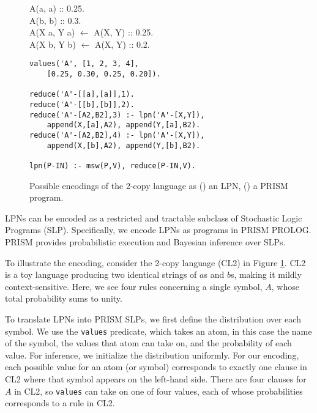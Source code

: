 \documentclass[11pt, twocolumn]{article}
\begin{document}
\begin{figure}[t]
	\centering
	\begin{minipage}[b]{\linewidth}
A(a, a) :: 0.25. \\
A(b, b) :: 0.3. \\
A(X a, Y a) $\leftarrow$ A(X, Y) :: 0.25. \\
A(X b, Y b) $\leftarrow$ A(X, Y) :: 0.2.
		\subcaption{}
		\label{fig:grammar}
	\end{minipage}
	\begin{minipage}[b]{\linewidth}
		\begin{lstlisting}
values('A', [1, 2, 3, 4],
    [0.25, 0.30, 0.25, 0.20]).

reduce('A'-[[a],[a]],1).
reduce('A'-[[b],[b]],2).
reduce('A'-[A2,B2],3) :- lpn('A'-[X,Y]),
    append(X,[a],A2), append(Y,[a],B2).
reduce('A'-[A2,B2],4) :- lpn('A'-[X,Y]),
    append(X,[b],A2), append(Y,[b],B2).

lpn(P-IN) :- msw(P,V), reduce(P-IN,V).
		\end{lstlisting}
		\subcaption{}
		\label{fig:prism}
	\end{minipage}
	\caption{Possible encodings of the 2-copy language as () an LPN, () a PRISM program.}
	\label{fig:copy}
\end{figure}

LPNs can be encoded as a restricted and tractable subclass of Stochastic Logic Programs (SLP). Specifically, we encode LPNs as programs in PRISM PROLOG. PRISM provides probabilistic execution and Bayesian inference over SLPs.

To illustrate the encoding, consider the 2-copy language (CL2) in Figure \ref{fig:copy}. CL2 is a toy language producing two identical strings of $a$s and $b$s, making it mildly context-sensitive. Here, we see four rules concerning a single symbol, $A$, whose total probability sums to unity.

To translate LPNs into PRISM SLPs, we first define the distribution over each symbol. We use the {\tt values} predicate, which takes an atom, in this case the name of the symbol, the values that atom can take on, and the probability of each value. For inference, we initialize the distribution uniformly. For our encoding, each possible value for an atom (or symbol) corresponds to exactly one clause in CL2 where that symbol appears on the left-hand side. There are four clauses for $A$ in CL2, so {\tt values} can take on one of four values, each of whose probabilities corresponds to a rule in CL2.
\end{document}
